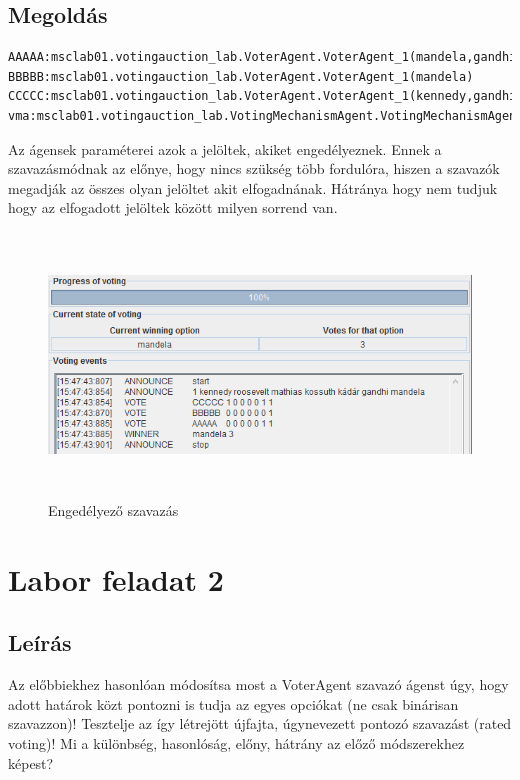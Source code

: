 \subsection{Megoldás}
\begin{lstlisting}[caption=Engedélyező run-config, frame=single,float=!ht]
AAAAA:msclab01.votingauction_lab.VoterAgent.VoterAgent_1(mandela,gandhi)
BBBBB:msclab01.votingauction_lab.VoterAgent.VoterAgent_1(mandela)
CCCCC:msclab01.votingauction_lab.VoterAgent.VoterAgent_1(kennedy,gandhi,mandela)
vma:msclab01.votingauction_lab.VotingMechanismAgent.VotingMechanismAgent(voting01.cfg)
\end{lstlisting}
Az ágensek paraméterei azok a jelöltek, akiket engedélyeznek. Ennek a szavazásmódnak az előnye, hogy nincs szükség több fordulóra, hiszen a szavazók megadják az összes olyan jelöltet akit elfogadnának. Hátránya hogy nem tudjuk hogy az elfogadott jelöltek között milyen sorrend van.
\begin{figure}[!h]
\begin{center}
\includegraphics[height=7cm]{figures/fel1.png}
\caption{Engedélyező szavazás}
\end{center}
\end{figure}

\section{Labor feladat 2}
\subsection{Leírás}
Az előbbiekhez hasonlóan módosítsa most a VoterAgent szavazó ágenst úgy, hogy adott
határok közt pontozni is tudja az egyes opciókat (ne csak binárisan szavazzon)! Tesztelje az
így létrejött újfajta, úgynevezett pontozó szavazást (rated voting)! Mi a különbség,
hasonlóság, előny, hátrány az előző módszerekhez képest?
